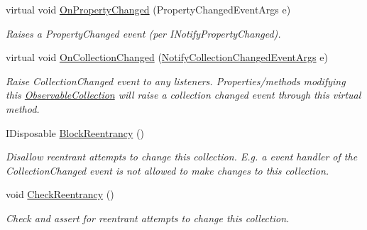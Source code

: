 \begin{DoxyCompactItemize}
virtual void \hyperlink{class_system_1_1_collections_1_1_object_model_1_1_observable_collection_a633ec41651b17ae4880a8edf64e82f30}{On\+Property\+Changed} (Property\+Changed\+Event\+Args e)
\begin{DoxyCompactList}\small\item\em Raises a Property\+Changed event (per I\+Notify\+Property\+Changed). \end{DoxyCompactList}\item 
virtual void \hyperlink{class_system_1_1_collections_1_1_object_model_1_1_observable_collection_ae93e6e3e8052be3bd70c66b9c53451ab}{On\+Collection\+Changed} (\hyperlink{class_system_1_1_collections_1_1_specialized_1_1_notify_collection_changed_event_args}{Notify\+Collection\+Changed\+Event\+Args} e)
\begin{DoxyCompactList}\small\item\em Raise Collection\+Changed event to any listeners. Properties/methods modifying this \hyperlink{class_system_1_1_collections_1_1_object_model_1_1_observable_collection}{Observable\+Collection} will raise a collection changed event through this virtual method. \end{DoxyCompactList}\item 
I\+Disposable \hyperlink{class_system_1_1_collections_1_1_object_model_1_1_observable_collection_a5e3bd1cc8385d41ef18c5cd7142c33d1}{Block\+Reentrancy} ()
\begin{DoxyCompactList}\small\item\em Disallow reentrant attempts to change this collection. E.\+g. a event handler of the Collection\+Changed event is not allowed to make changes to this collection. \end{DoxyCompactList}\item 
void \hyperlink{class_system_1_1_collections_1_1_object_model_1_1_observable_collection_a439683a525265dbad655fbe3d8cb4979}{Check\+Reentrancy} ()
\begin{DoxyCompactList}\small\item\em Check and assert for reentrant attempts to change this collection. \end{DoxyCompactList}\end{DoxyCompactItemize}
